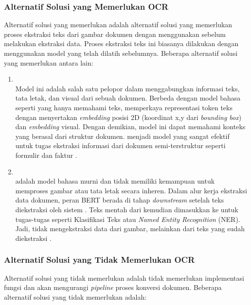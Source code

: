 \subsubsection{Alternatif Solusi yang Memerlukan OCR}
\label{subsubsec:alternatif-solusi-memerlukan-ocr}
Alternatif solusi yang memerlukan \ocr{} adalah alternatif solusi yang memerlukan proses ekstraksi teks dari gambar dokumen dengan menggunakan \ocr{} sebelum melakukan ekstraksi data. Proses ekstraksi teks ini biasanya dilakukan dengan menggunakan model \ocr{} yang telah dilatih sebelumnya. Beberapa alternatif solusi yang memerlukan \ocr{} antara lain:
\begin{enumerate}
    \item \layoutlm ~\\ Model ini adalah salah satu pelopor dalam menggabungkan informasi teks, tata letak, dan visual dari sebuah dokumen. Berbeda dengan model bahasa seperti \bert{} yang hanya memahami teks, \layoutlm{} memperkaya representasi token teks dengan menyertakan \textit{embedding} posisi 2D (koordinat x,y dari \emph{bounding box}) dan \textit{embedding} visual. Dengan demikian, model ini dapat memahami konteks yang berasal dari struktur dokumen. \layoutlm{} menjadi model yang sangat efektif untuk tugas ekstraksi informasi dari dokumen semi-terstruktur seperti formulir dan faktur \parencite{xu2020layoutlm}. 
    \item \bert{} ~\\
    \bert{} adalah model bahasa murni dan tidak memiliki kemampuan untuk memproses gambar atau tata letak secara inheren. Dalam alur kerja ekstraksi data dokumen, peran BERT berada di tahap \textit{downstream} setelah teks diekstraksi oleh sistem \ocr. Teks mentah dari \ocr{} kemudian dimasukkan ke \bert{} untuk tugas-tugas \nlp{} seperti Klasifikasi Teks atau \emph{Named Entity Recognition} (NER). Jadi, \bert{} tidak mengekstraksi data dari gambar, melainkan dari teks yang sudah diekstraksi \parencite{koroteev2021bert}. 
\end{enumerate}

\subsubsection{Alternatif Solusi yang Tidak Memerlukan OCR}
\label{subsubsec:alternatif-solusi-tidak-memerlukan-ocr}
Alternatif solusi yang tidak memerlukan \ocr{} adalah tidak memerlukan implementasi fungsi \ocr{} dan akan mengurangi \emph{pipeline} proses konversi dokumen. Beberapa alternatif solusi yang tidak memerlukan \ocr{} adalah:

